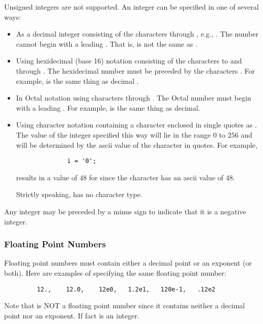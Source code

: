    Unsigned integers are not supported.  An integer can be specified in one
   of several ways:
\begin{itemize}
\item As a decimal integer consisting of the characters  through
      , e.g., .  The number cannot begin with a leading
      .  That is,  is not the same as .

\item Using hexidecimal (base 16) notation consisting of the characters
       to  and  through .  The hexidecimal
      number must be preceded by the characters .  For example,
       is the same thing as decimal .

\item In Octal notation using characters  through .  The Octal
      number must begin with a leading .  For example,  is
      the same thing as  decimal.

\item Using character notation containing a character enclosed in single
      quotes as .   The value of the integer specified this way will
      lie in the range $0$ to $256$ and will be determined by the ascii
      value of the character in quotes.  For example, 
\begin{verbatim}
              i = '0';
\end{verbatim}
      results in a value of 48 for  since the character  has an
      ascii value of 48. 

      Strictly speaking, \slang{} has no character type.
\end{itemize}

    Any integer may be preceded by a minus sign to indicate that it is a
    negative integer.
   
   
\subsubsection{Floating Point Numbers}

    Floating point numbers must contain either a decimal point or an
    exponent (or both). Here are examples of specifying the same floating
    point number:
\begin{verbatim}
         12.,    12.0,    12e0,   1.2e1,   120e-1,   .12e2
\end{verbatim}
    Note that  is NOT a floating point number since it contains neither
    a decimal point nor an exponent.  If fact  is an integer.
    
